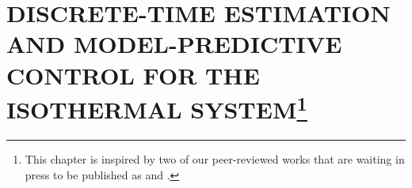 \chapter[
    Discrete-time Estimation and Model-Predictive Control for the Isothermal System
]{
    \MakeUppercase{Discrete-time Estimation and Model-Predictive Control for the Isothermal System}\footnote{
        This chapter is inspired by two of our peer-reviewed works that are waiting in press to be published as  and .
    }}
\label{ch:2}





